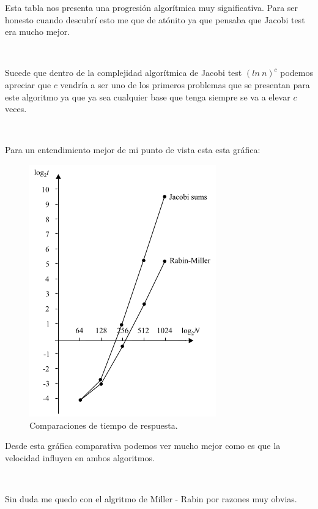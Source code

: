 \documentclass[11pt, conference]{IEEEtran}
\begin{document}
Esta tabla nos presenta una progresión algorítmica muy significativa. Para ser honesto cuando descubrí esto me que de atónito ya que pensaba que Jacobi test era mucho mejor.\cite{h}

\

Sucede que dentro de la complejidad algorítmica de Jacobi test $(ln\ n)^{c}$ podemos apreciar que $c$ vendría a ser uno de los primeros problemas que se presentan para este algoritmo ya que ya sea cualquier base que tenga siempre se va a elevar $c$ veces.

\

Para un entendimiento mejor de mi punto de vista esta esta gráfica:

\begin{figure}[h]
	\begin{center}
		\includegraphics[scale=0.8]{8.png}
		\caption{Comparaciones de tiempo de respuesta.} 
	\end{center}
\end{figure}

Desde esta gráfica comparativa podemos ver mucho mejor como es que la velocidad influyen en ambos algoritmos.

\

Sin duda me quedo con el algritmo de Miller - Rabin por razones muy obvias.

\onecolumn



\end{document}
